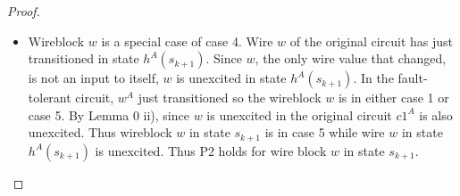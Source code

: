 \documentclass[12pt]{report}
\begin{document}
\begin{proof}
\begin{itemize}
\begin{itemize}
\item
Wireblock $w$ is a special case of case 4.  Wire $w$ of the original circuit has just transitioned in state $h^A(s_{k+1})$.  Since $w$, the only wire value that changed, is not an input to itself, $w$ is unexcited in state $h^A(s_{k+1})$.  In the fault-tolerant circuit, $w^A$ just transitioned so the wireblock $w$ is in either case 1 or case 5.  By Lemma 0 ii), since $w$ is unexcited in the original circuit $c1^A$ is also unexcited.  Thus wireblock $w$ in state $s_{k+1}$ is in case 5 while wire $w$ in state $h^A(s_{k+1})$ is unexcited.  Thus P2 holds for wire block $w$ in state $s_{k+1}$.


\end{itemize}
\end{itemize}
\end{proof}
\end{document}
